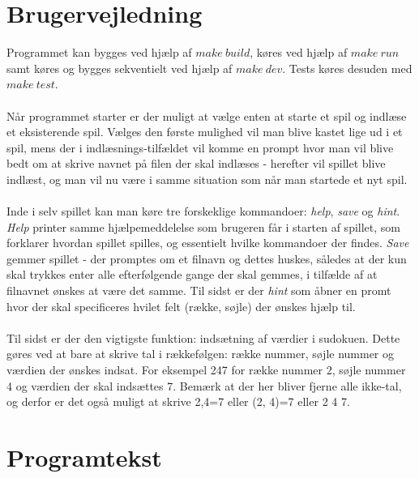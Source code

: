 \documentclass[a4paper]{article}
\begin{document}
	\section{Brugervejledning}
	Programmet kan bygges ved hjælp af $make\ build$, køres ved hjælp af $make\ run$ samt køres og bygges sekventielt ved hjælp af $make\ dev$. Tests køres desuden med $make\ test$.
	\\\\
	Når programmet starter er der muligt at vælge enten at starte et spil og indlæse et eksisterende spil. Vælges den første mulighed vil man blive kastet lige ud i et spil, mens der i indlæsnings-tilfældet vil komme en prompt hvor man vil blive bedt om at skrive navnet på filen der skal indlæses - herefter vil spillet blive indlæst, og man vil nu være i samme situation som når man startede et nyt spil.
	\\\\
	Inde i selv spillet kan man køre tre forskeklige kommandoer: \emph{help}, \emph{save} og \emph{hint}. \emph{Help} printer samme hjælpemeddelelse som brugeren får i starten af spillet, som forklarer hvordan spillet spilles, og essentielt hvilke kommandoer der findes. \emph{Save} gemmer spillet - der promptes om et filnavn og dettes huskes, således at der kun skal trykkes enter alle efterfølgende gange der skal gemmes, i tilfælde af at filnavnet ønskes at være det samme. Til sidst er der \emph{hint} som åbner en promt hvor der skal specificeres hvilet felt (række, søjle) der ønskes hjælp til. 
	\\\\
	Til sidst er der den vigtigste funktion: indsætning af værdier i sudokuen. Dette gøres ved at bare at skrive tal i rækkefølgen: række nummer, søjle nummer og værdien der ønskes indsat. For eksempel 247 for række nummer 2, søjle nummer 4 og værdien der skal indsættes 7. Bemærk at der her bliver fjerne alle ikke-tal, og derfor er det også muligt at skrive 2,4=7 eller (2, 4)=7 eller 2 4 7.
	
	
	\section{Programtekst}
	
	
	
	
    
	
    
\end{document}
